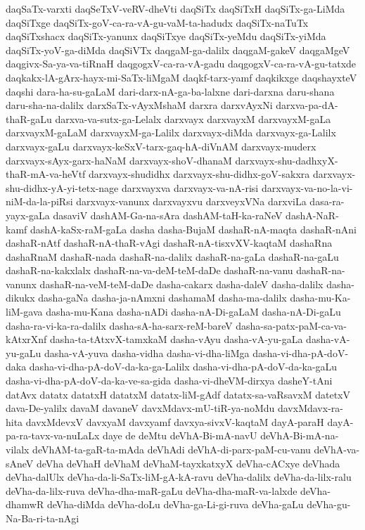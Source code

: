 {daqSaTx-varxti
daqSeTxV-veRV-dheVti
daqSiTx
daqSiTxH
daqSiTx-ga-LiMda
daqSiTxge
daqSiTx-goV-ca-ra-vA-gu-vaM-ta-hadudx
daqSiTx-naTuTx
daqSiTxshacx
daqSiTx-yanunx
daqSiTxye
daqSiTx-yeMdu
daqSiTx-yiMda
daqSiTx-yoV-ga-diMda
daqSiVTx
daqgaM-ga-dalilx
daqgaM-gakeV
daqgaMgeV
daqgivx-Sa-ya-va-tiRnaH
daqgogxV-ca-ra-vA-gadu
daqgogxV-ca-ra-vA-gu-tatxde
daqkakx-lA-gArx-hayx-mi-SaTx-liMgaM
daqkf-tarx-yamf
daqkikxge
daqshayxteV
daqshi
dara-ha-su-gaLaM
dari-darx-nA-ga-ba-lalxne
dari-darxna
daru-shana
daru-sha-na-dalilx
darxSaTx-vAyxMshaM
darxra
darxvAyxNi
darxva-pa-dA-thaR-gaLu
darxva-va-sutx-ga-Lelalx
darxvayx
darxvayxM
darxvayxM-gaLa
darxvayxM-gaLaM
darxvayxM-ga-Lalilx
darxvayx-diMda
darxvayx-ga-Lalilx
darxvayx-gaLu
darxvayx-keSxV-tarx-gaq-hA-diVnAM
darxvayx-muderx
darxvayx-sAyx-garx-haNaM
darxvayx-shoV-dhanaM
darxvayx-shu-dadhxyX-thaR-mA-va-heVtf
darxvayx-shudidhx
darxvayx-shu-didhx-goV-sakxra
darxvayx-shu-didhx-yA-yi-tetx-nage
darxvayxva
darxvayx-va-nA-risi
darxvayx-va-no-la-vi-niM-da-la-piRsi
darxvayx-vanunx
darxvayxvu
darxveyxVNa
darxviLa
dasa-ra-yayx-gaLa
dasaviV
dashAM-Ga-na-sAra
dashAM-taH-ka-raNeV
dashA-NaR-kamf
dashA-kaSx-raM-gaLa
dasha
dasha-BujaM
dashaR-nA-maqta
dashaR-nAni
dashaR-nAtf
dashaR-nA-thaR-vAgi
dashaR-nA-tisxvXV-kaqtaM
dashaRna
dashaRnaM
dashaR-nada
dashaR-na-dalilx
dashaR-na-gaLa
dashaR-na-gaLu
dashaR-na-kakxlalx
dashaR-na-va-deM-teM-daDe
dashaR-na-vanu
dashaR-na-vanunx
dashaR-na-veM-teM-daDe
dasha-cakarx
dasha-daleV
dasha-dalilx
dasha-dikukx
dasha-gaNa
dasha-ja-nAmxni
dashamaM
dasha-ma-dalilx
dasha-mu-Ka-liM-gava
dasha-mu-Kana
dasha-nADi
dasha-nA-Di-gaLaM
dasha-nA-Di-gaLu
dasha-ra-vi-ka-ra-dalilx
dasha-sA-ha-sarx-reM-bareV
dasha-sa-patx-paM-ca-va-kAtxrXnf
dasha-ta-tAtxvX-tamxkaM
dasha-vAyu
dasha-vA-yu-gaLa
dasha-vA-yu-gaLu
dasha-vA-yuva
dasha-vidha
dasha-vi-dha-liMga
dasha-vi-dha-pA-doV-daka
dasha-vi-dha-pA-doV-da-ka-ga-Lalilx
dasha-vi-dha-pA-doV-da-ka-gaLu
dasha-vi-dha-pA-doV-da-ka-ve-sa-gida
dasha-vi-dheVM-dirxya
dasheY-tAni
datAvx
datatx
datatxH
datatxM
datatx-liM-gAdf
datatx-sa-vaRsavxM
datetxV
dava-De-yalilx
davaM
davaneV
davxMdavx-mU-tiR-ya-noMdu
davxMdavx-ra-hita
davxMdevxV
davxyaM
davxyamf
davxya-sivxV-kaqtaM
dayA-paraH
dayA-pa-ra-tavx-va-nuLaLx
daye
de
deMtu
deVhA-Bi-mA-navU
deVhA-Bi-mA-na-vilalx
deVhAM-ta-gaR-ta-mAda
deVhAdi
deVhA-di-parx-paM-cu-vanu
deVhA-va-sAneV
deVha
deVhaH
deVhaM
deVhaM-tayxkatxyX
deVha-cACxye
deVhada
deVha-dalUlx
deVha-da-li-SaTx-liM-gA-kA-ravu
deVha-dalilx
deVha-da-lilx-ralu
deVha-da-lilx-ruva
deVha-dha-maR-gaLu
deVha-dha-maR-va-lalxde
deVha-dhamwR
deVha-diMda
deVha-doLu
deVha-ga-Li-gi-ruva
deVha-gaLu
deVha-gu-Na-Ba-ri-ta-nAgi
}
